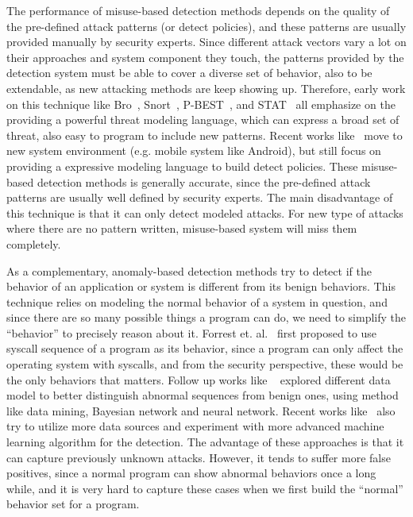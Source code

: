 The performance of misuse-based detection methods depends on the quality
of the pre-defined attack patterns (or detect policies), and these 
patterns are usually provided manually by security experts. Since 
different attack vectors vary a lot on their approaches and system 
component they touch, the 
patterns provided by the detection system must be able to cover a 
diverse set of behavior, also to be extendable, as new attacking
methods are keep showing up. Therefore, early work on this technique like
Bro~\cite{paxson1999bro}, Snort~\cite{roesch1999snort}, 
P-BEST~\cite{lindqvist1999detecting}, and STAT~\cite{vigna2003designing}
all emphasize on the providing a powerful threat modeling language, which
can express a broad set of threat, also easy to program to include new 
patterns. Recent works like~\cite{bugiel2012towards} move to new
system environment (e.g. mobile system like Android), but still focus
on providing a expressive modeling language to build detect policies. 
These misuse-based detection methods is generally accurate, since the
pre-defined attack patterns are usually well defined by security experts. 
The main disadvantage of this technique is that it can only detect 
modeled attacks. For new type of attacks where there are no pattern
written, misuse-based system will miss them completely.

As a complementary, anomaly-based detection methods try to detect if
the behavior of an application or system is different from its benign
behaviors. This technique relies on modeling the normal behavior of a 
system in question, and since there are so many possible things a program 
can do, we need to simplify the ``behavior'' to precisely reason about 
it. Forrest et. al.~\cite{forrest1996sense} first proposed to use
syscall sequence of a program as its behavior, since a program can only
affect the operating system with syscalls, and from the security 
perspective, these would be the only behaviors that matters. Follow up
works like ~\cite{lee1998data, warrender1999detecting, mutz2006anomalous}
explored different data model to better distinguish abnormal sequences
from benign ones, using method like data mining, Bayesian network and 
neural network. Recent works like~\cite{du2017deeplog} also try to 
utilize more data sources and experiment with more advanced machine
learning algorithm for the detection. The advantage of these approaches 
is that it can capture previously unknown attacks. However, it tends
to suffer more false positives, since a normal program can show abnormal
behaviors once a long while, and it is very hard to capture these
cases when we first build the ``normal'' behavior set for a program.

